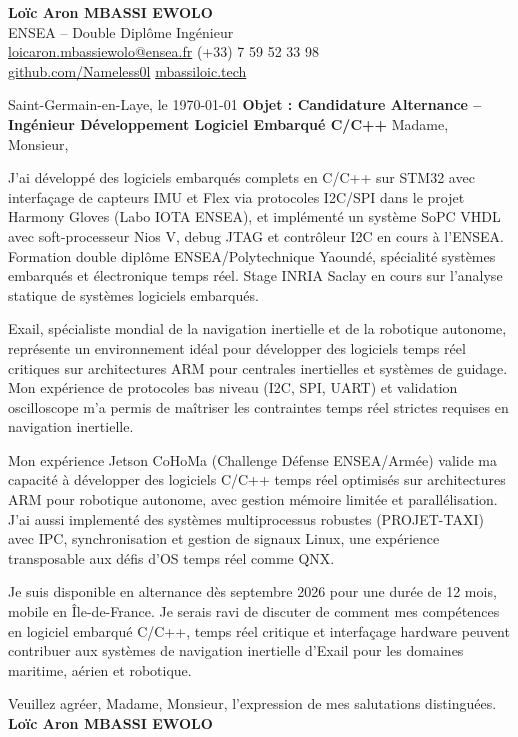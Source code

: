 \documentclass[a4paper,11pt]{article}
\begin{document}
\noindent \textbf{Lo\"ic Aron MBASSI EWOLO} \\
ENSEA -- Double Dipl\^ome Ing\'enieur \\
\href{mailto:loicaron.mbassiewolo@ensea.fr}{loicaron.mbassiewolo@ensea.fr} \quad (+33) 7 59 52 33 98 \\
\href{https://github.com/Nameless0l}{github.com/Nameless0l} \quad \href{https://mbassiloic.tech}{mbassiloic.tech}

\vspace{1em}\noindent Saint-Germain-en-Laye, le \today
\vspace{1em}\noindent \textbf{Objet : Candidature Alternance -- Ing\'enieur D\'eveloppement Logiciel Embarqu\'e C/C++}
\vspace{1.5em}\noindent Madame, Monsieur,

\vspace{0.8em}\noindent J'ai d\'evelopp\'e des logiciels embarqu\'es complets en C/C++ sur STM32 avec interfaçage de capteurs IMU et Flex via protocoles I2C/SPI dans le projet Harmony Gloves (Labo IOTA ENSEA), et impl\'ement\'e un syst\`eme SoPC VHDL avec soft-processeur Nios V, debug JTAG et contr\^oleur I2C en cours \`a l'ENSEA. Formation double dipl\^ome ENSEA/Polytechnique Yaound\'e, sp\'ecialit\'e syst\`emes embarqu\'es et \'electronique temps r\'eel. Stage INRIA Saclay en cours sur l'analyse statique de syst\`emes logiciels embarqu\'es.

\vspace{0.8em}\noindent Exail, sp\'ecialiste mondial de la navigation inertielle et de la robotique autonome, repr\'esente un environnement id\'eal pour d\'evelopper des logiciels temps r\'eel critiques sur architectures ARM pour centrales inertielles et syst\`emes de guidage. Mon exp\'erience de protocoles bas niveau (I2C, SPI, UART) et validation oscilloscope m'a permis de maîtriser les contraintes temps r\'eel strictes requises en navigation inertielle.

\vspace{0.8em}\noindent Mon exp\'erience Jetson CoHoMa (Challenge D\'efense ENSEA/Arm\'ee) valide ma capacit\'e \`a d\'evelopper des logiciels C/C++ temps r\'eel optimis\'es sur architectures ARM pour robotique autonome, avec gestion m\'emoire limit\'ee et parallélisation. J'ai aussi implement\'e des syst\`emes multiprocessus robustes (PROJET-TAXI) avec IPC, synchronisation et gestion de signaux Linux, une exp\'erience transposable aux d\'efis d'OS temps r\'eel comme QNX.

\vspace{0.8em}\noindent Je suis disponible en alternance d\`es septembre 2026 pour une dur\'ee de 12 mois, mobile en Île-de-France. Je serais ravi de discuter de comment mes comp\'etences en logiciel embarqu\'e C/C++, temps r\'eel critique et interfaçage hardware peuvent contribuer aux syst\`emes de navigation inertielle d'Exail pour les domaines maritime, a\'erien et robotique.

\vspace{1.5em}\noindent Veuillez agr\'eer, Madame, Monsieur, l'expression de mes salutations distingu\'ees.
\vspace{2em}\noindent \textbf{Lo\"ic Aron MBASSI EWOLO}
\end{document}
